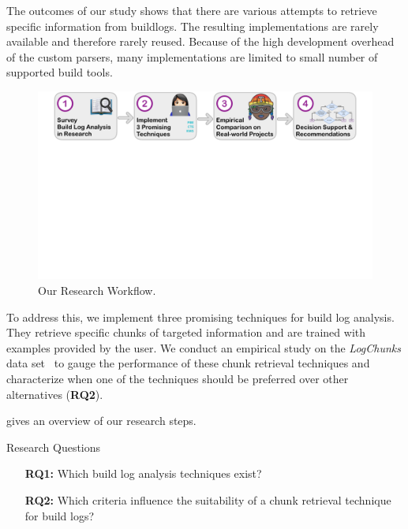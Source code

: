 The outcomes of our study shows that there are various attempts to
retrieve specific information from buildlogs.
The resulting implementations are rarely available and therefore rarely
reused.
Because of the high development overhead
of the custom parsers, many implementations are limited to small number
of supported build tools.

\begin{figure}[htb]
	\centering
	\includegraphics[width=\textwidth, trim={1.2cm 10.5cm 1.2cm 0cm},
	clip]{img/overview.pdf}
	\caption{Our Research Workflow.}
	\label{fig:overview}
\end{figure}

To address this, we implement three promising techniques for build
log analysis.
They retrieve specific chunks of targeted information and are trained
with examples provided by the user.
We conduct an empirical study on the \emph{LogChunks} data
set~\cite{brandt2020logchunks} to
gauge the performance of these chunk retrieval techniques and characterize
when one of the techniques should be preferred over other alternatives
(\textbf{RQ2}).

 gives an overview of our research steps.

\begin{simplebox}{Research Questions}
\begin{itemize}
  \item[\textbf{RQ1:}] Which build log analysis techniques exist?
  \item[\textbf{RQ2:}] Which criteria influence the suitability of a chunk
  retrieval technique for build logs?
\end{itemize}
\end{simplebox}


